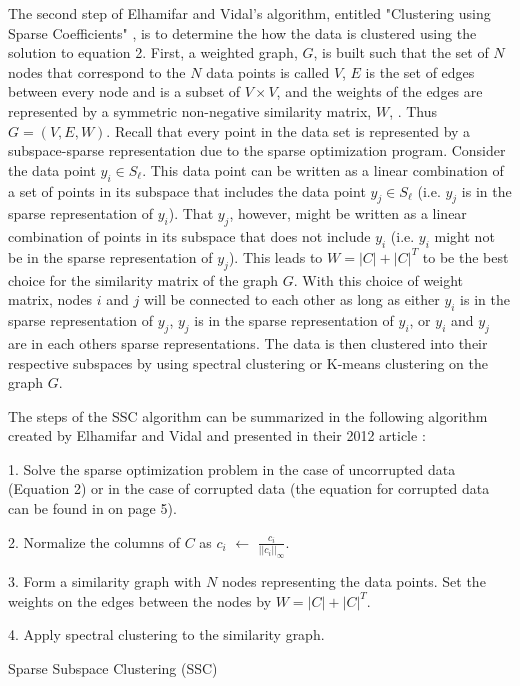 \documentclass{article}
\begin{document}
The second step of Elhamifar and Vidal's algorithm, entitled "Clustering using Sparse Coefficients" \cite{elhamifar2012sparse}, is to determine the how the data is clustered using the solution to equation 2. First, a weighted graph, $G$, is built such that the set of $N$ nodes that correspond to the $N$ data points is called $V$, $E$ is the set of edges between every node and is a subset of $V \times V$, and the weights of the edges are represented by a symmetric non-negative similarity matrix, $W$, \cite{elhamifar2012sparse}. Thus $G = (V, E, W)$. Recall that every point in the data set is represented by a subspace-sparse representation due to the sparse optimization program. Consider the data point $y_i \in S_\ell$. This data point can be written as a linear combination of a set of points in its subspace that includes the data point $y_j \in S_\ell$ (i.e. $y_j$ is in the sparse representation of $y_i$). That $y_j$, however, might be written as a linear combination of points in its subspace that does not include $y_i$ (i.e. $y_i$ might not be in the sparse representation of $y_j$). This leads to $W = |C| + |C|^T$ to be the best choice for the similarity matrix of the graph $G$. With this choice of weight matrix, nodes $i$ and $j$ will be connected to each other as long as either $y_i$ is in the sparse representation of $y_j$, $y_j$ is in the sparse representation of $y_i$, or $y_i$ and $y_j$ are in each others sparse representations. The data is then clustered into their respective subspaces by using spectral clustering or K-means clustering on the graph $G$. \cite{elhamifar2012sparse} 

The steps of the SSC algorithm can be summarized in the following algorithm created by Elhamifar and Vidal and presented in their 2012 article \cite{elhamifar2012sparse}:

\begin{algorithm}[h!]


 1. Solve the sparse optimization problem in the case of uncorrupted data (Equation 2) or in the case of corrupted data (the equation for corrupted data can be found in \cite{elhamifar2012sparse} on page 5).
 
 2. Normalize the columns of $C$ as $c_i$ $\leftarrow$ $\frac{c_i}{||c_i||_{\infty}}$.
 
 3. Form a similarity graph with $N$ nodes representing the data points. Set the weights on the edges between the nodes by $W = |C|+|C|^T$.
 
 4. Apply spectral clustering to the similarity graph.


 \caption{Sparse Subspace Clustering (SSC)}\label{ALG:PWR}
 
\end{algorithm}
\end{document}
